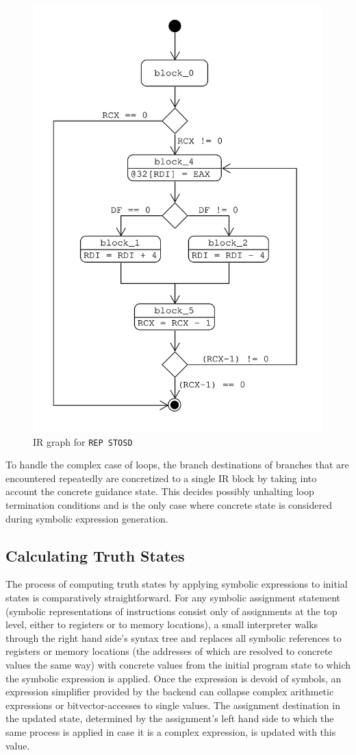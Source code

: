 \begin{figure}[htpb]
    \centering
    \includegraphics[width=0.7\linewidth]{figures/ir_graph_repstosd.png}
    \caption{IR graph for \texttt{REP STOSD}}\label{fig:ir_graph_repstod}
\end{figure}

To handle the complex case of loops, the branch destinations of branches that are encountered repeatedly are concretized
to a single IR block by taking into account the concrete guidance state. This decides possibly unhalting loop
termination conditions and is the only case where concrete state is considered during symbolic expression generation.

\subsection{Calculating Truth States}

The process of computing truth states by applying symbolic expressions to initial states is comparatively
straightforward. For any symbolic assignment statement (symbolic representations of instructions consist only of
assignments at the top level, either to registers or to memory locations), a small interpreter walks through the right
hand side's syntax tree and replaces all symbolic references to registers or memory locations (the addresses of which
are resolved to concrete values the same way) with concrete values from the initial program state to which the symbolic
expression is applied. Once the expression is devoid of symbols, an expression simplifier provided by the backend can
collapse complex arithmetic expressions or bitvector-accesses to single values. The assignment destination in the
updated state, determined by the assignment's left hand side to which the same process is applied in case it is a
complex expression, is updated with this value.


